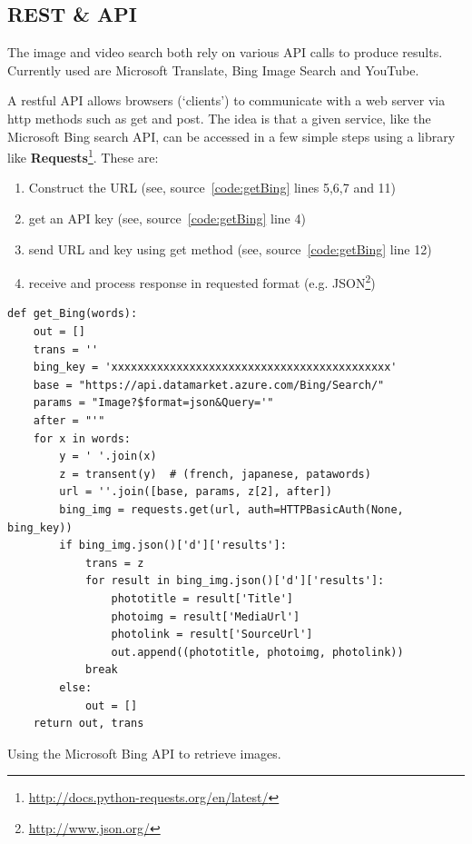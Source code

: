 \subsection{REST \& API}

The image and video search both rely on various \ac{API} calls to produce results. Currently used are Microsoft Translate, Bing Image Search and YouTube.

A \acrshort{rest}ful \ac{API} allows browsers (`clients') to communicate with a web server via \acrshort{http} methods such as \ac{get} and \ac{post}. The idea is that a given service, like the Microsoft Bing search \ac{API}, can be accessed in a few simple steps using a library like \textbf{Requests}\footnote{\url{http://docs.python-requests.org/en/latest/}}. These are:

\begin{enumerate}
  \item Construct the \ac{URL} (see, source~\ref{code:getBing} lines 5,6,7 and 11)
  \item get an \ac{API} key (see, source~\ref{code:getBing} line 4)
  \item send \ac{URL} and key using \ac{get} method (see, source~\ref{code:getBing} line 12)
  \item receive and process response in requested format (e.g. \ac{JSON}\footnote{\url{http://www.json.org/}})
\end{enumerate}

\begin{listing}
  \begin{verbatim}
def get_Bing(words):
    out = []
    trans = ''
    bing_key = 'xxxxxxxxxxxxxxxxxxxxxxxxxxxxxxxxxxxxxxxxxxx'
    base = "https://api.datamarket.azure.com/Bing/Search/"
    params = "Image?$format=json&Query='"
    after = "'"
    for x in words:
        y = ' '.join(x)
        z = transent(y)  # (french, japanese, patawords)
        url = ''.join([base, params, z[2], after])
        bing_img = requests.get(url, auth=HTTPBasicAuth(None, bing_key))
        if bing_img.json()['d']['results']:
            trans = z
            for result in bing_img.json()['d']['results']:
                phototitle = result['Title']
                photoimg = result['MediaUrl']
                photolink = result['SourceUrl']
                out.append((phototitle, photoimg, photolink))
            break
        else:
            out = []
    return out, trans
  \end{verbatim}
\caption{Using the Microsoft Bing API to retrieve images.}
\label{code:getBing}
\end{listing}

